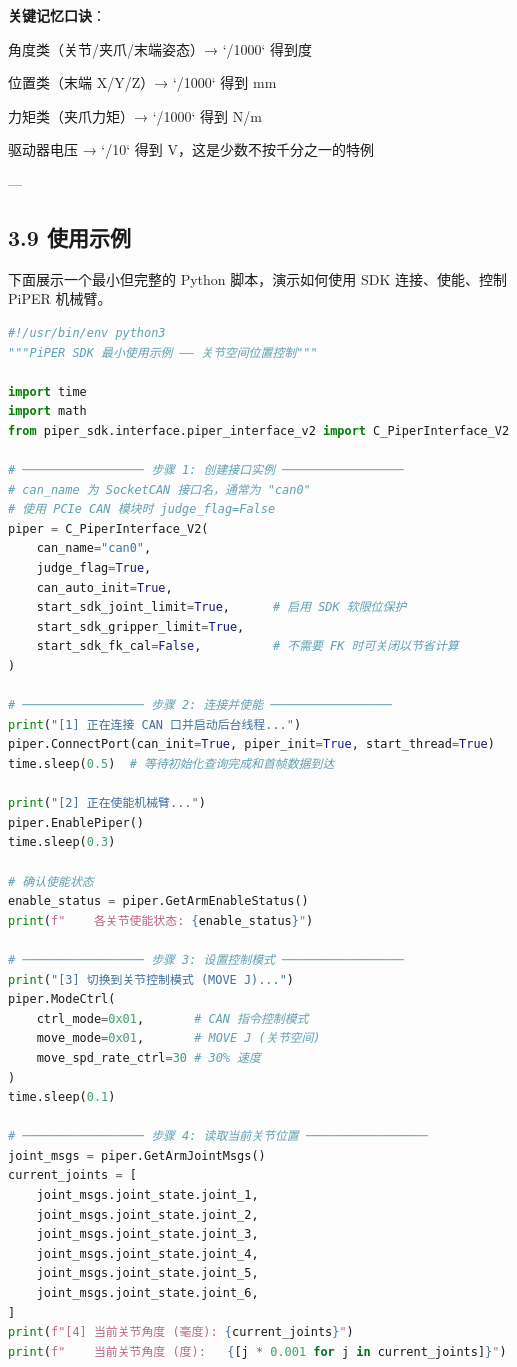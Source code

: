 \documentclass[UTF8,a4paper,11pt]{ctexart}
\begin{document}
\textbf{关键记忆口诀}：
\item 角度类（关节/夹爪/末端姿态）→ `/1000` 得到度
\item 位置类（末端 X/Y/Z）→ `/1000` 得到 mm
\item 力矩类（夹爪力矩）→ `/1000` 得到 N/m
\item 驱动器电压 → `/10` 得到 V，这是少数不按千分之一的特例

---

\subsection{3.9 使用示例}

下面展示一个最小但完整的 Python 脚本，演示如何使用 SDK 连接、使能、控制 PiPER 机械臂。

\begin{lstlisting}[language=python]
#!/usr/bin/env python3
"""PiPER SDK 最小使用示例 —— 关节空间位置控制"""

import time
import math
from piper_sdk.interface.piper_interface_v2 import C_PiperInterface_V2

# ───────────────── 步骤 1: 创建接口实例 ─────────────────
# can_name 为 SocketCAN 接口名，通常为 "can0"
# 使用 PCIe CAN 模块时 judge_flag=False
piper = C_PiperInterface_V2(
    can_name="can0",
    judge_flag=True,
    can_auto_init=True,
    start_sdk_joint_limit=True,      # 启用 SDK 软限位保护
    start_sdk_gripper_limit=True,
    start_sdk_fk_cal=False,          # 不需要 FK 时可关闭以节省计算
)

# ───────────────── 步骤 2: 连接并使能 ─────────────────
print("[1] 正在连接 CAN 口并启动后台线程...")
piper.ConnectPort(can_init=True, piper_init=True, start_thread=True)
time.sleep(0.5)  # 等待初始化查询完成和首帧数据到达

print("[2] 正在使能机械臂...")
piper.EnablePiper()
time.sleep(0.3)

# 确认使能状态
enable_status = piper.GetArmEnableStatus()
print(f"    各关节使能状态: {enable_status}")

# ───────────────── 步骤 3: 设置控制模式 ─────────────────
print("[3] 切换到关节控制模式 (MOVE J)...")
piper.ModeCtrl(
    ctrl_mode=0x01,       # CAN 指令控制模式
    move_mode=0x01,       # MOVE J (关节空间)
    move_spd_rate_ctrl=30 # 30% 速度
)
time.sleep(0.1)

# ───────────────── 步骤 4: 读取当前关节位置 ─────────────────
joint_msgs = piper.GetArmJointMsgs()
current_joints = [
    joint_msgs.joint_state.joint_1,
    joint_msgs.joint_state.joint_2,
    joint_msgs.joint_state.joint_3,
    joint_msgs.joint_state.joint_4,
    joint_msgs.joint_state.joint_5,
    joint_msgs.joint_state.joint_6,
]
print(f"[4] 当前关节角度 (毫度): {current_joints}")
print(f"    当前关节角度 (度):   {[j * 0.001 for j in current_joints]}")


\end{lstlisting}
\end{document}
